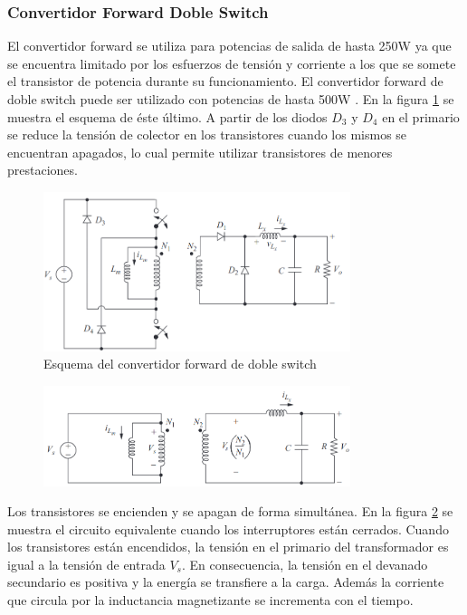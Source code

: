 \subsubsection{Convertidor Forward Doble Switch}

El convertidor forward se utiliza para potencias de salida de hasta 250W ya que se encuentra limitado 
por los esfuerzos de tensión y corriente a los que se somete el transistor de potencia durante su funcionamiento. 
El convertidor forward de doble switch puede ser utilizado con potencias de hasta 500W \cite{hart}.
En la figura \ref{fig:forward_doble_switch} se muestra el esquema de éste último.
A partir de los diodos $D_3$ y $D_4$ en el primario se reduce la tensión de colector en los transistores cuando los mismos 
se encuentran apagados, lo cual permite utilizar transistores de menores prestaciones.

\begin{figure}[H]
    \centering
    \includegraphics[width=0.8\textwidth]{../images/hart/forward_doble_switch.png}
    \caption{Esquema del convertidor forward de doble switch}
    \label{fig:forward_doble_switch}
\end{figure}

\begin{figure}[H]
    \centering
    \includegraphics[width=0.8\textwidth]{images/hart/forward_doble_switch_closed.png}
    \caption{}
    \label{fig:forward_doble_switch_closed}
\end{figure}

Los transistores se encienden y se apagan de forma simultánea. 
En la figura \ref{fig:forward_doble_switch_closed} se muestra el circuito equivalente cuando los interruptores están cerrados.  
Cuando los transistores están encendidos, la tensión en el primario del transformador es igual a la tensión de entrada $V_s$. 
En consecuencia, la tensión en el devanado secundario es positiva y la energía se transfiere a la carga. 
Además la corriente que circula por la inductancia magnetizante se incrementa con el tiempo. 

